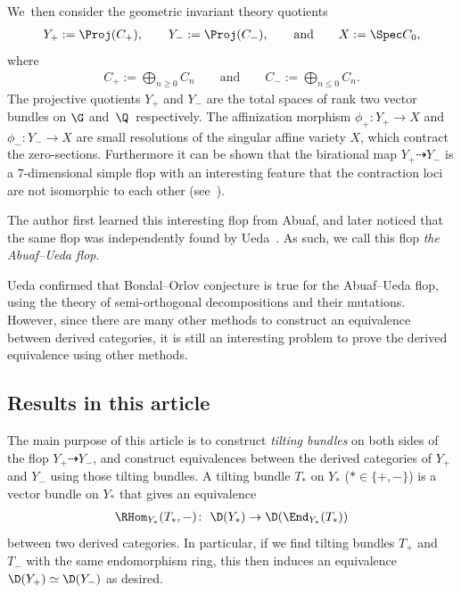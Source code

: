 We~then consider the geometric invariant theory quotients
\begin{gather*}
Y_+ := \Proj(C_+),\qquad
Y_- := \Proj(C_-),\qquad \text{and} \qquad
X := \Spec C_0,
\end{gather*}
where
\begin{gather*}
C_+ := \bigoplus_{n \geq 0} C_n \qquad \text{and} \qquad C_- := \bigoplus_{n \leq 0} C_n.
\end{gather*}
The projective quotients $Y_+$ and $Y_-$ are the total spaces of rank two vector bundles on $\G$ and~$\Q$~respectively.
The affinization morphism $\phi_+\colon Y_+ \to X$ and $\phi_-\colon Y_- \to X$ are small resolutions of the singular affine variety $X$,
which contract the zero-sections.
Furthermore it can be shown that the birational map $Y_+ \dashrightarrow Y_-$ is a $7$-dimensional simple flop with an interesting feature
that the contraction loci are not isomorphic to each other (see~\cite{Ued16}).

The author first learned this interesting flop from Abuaf,
and later noticed that the same flop was independently found by Ueda~\cite{Ued16}.
As such, we call this flop \textit{the Abuaf--Ueda flop}.

Ueda confirmed that Bondal--Orlov conjecture is true for the Abuaf--Ueda flop, using the theory of semi-orthogonal decompositions and their mutations.
However, since there are many other methods to construct an equivalence between derived categories,
it is still an interesting problem to prove the derived equivalence using other methods.

\subsection{Results in this article}
The main purpose of this article is to construct \textit{tilting bundles} on both sides of the flop $Y_+ \dashrightarrow Y_-$,
and construct equivalences between the derived categories of $Y_+$ and $Y_-$ using those tilting bundles.
A tilting bundle $T_{\ast}$ on $Y_{\ast}$ ($\ast \in \{ +, - \}$) is a vector bundle on $Y_{\ast}$ that gives an equivalence
\begin{gather*}
\RHom_{Y_{\ast}}(T_{\ast}, -)\colon \ \D(Y_{\ast}) \to \D(\End_{Y_{\ast}}(T_{\ast}))
\end{gather*}
between two derived categories.
In particular, if we find tilting bundles $T_+$ and $T_-$ with the same endomorphism ring, this then induces an equivalence
$\D(Y_+) \simeq \D(Y_-)$ as desired.

